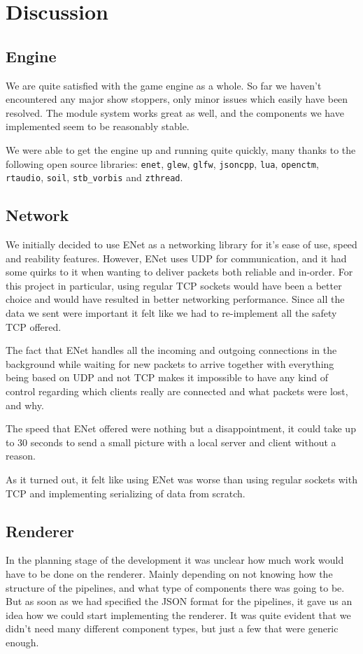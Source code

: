 \chapter{Discussion}

\section{Engine}
We are quite satisfied with the game engine as a whole. So far we haven't encountered any major show stoppers, only minor issues which easily have been resolved. The module system works great as well, and the components we have implemented seem to be reasonably stable.

We were able to get the engine up and running quite quickly, many thanks to the following open source libraries: \texttt{enet}, \texttt{glew}, \texttt{glfw}, \texttt{jsoncpp}, \texttt{lua}, \texttt{openctm}, \texttt{rtaudio}, \texttt{soil}, \texttt{stb\_vorbis} and \texttt{zthread}.

\section{Network}
We initially decided to use ENet as a networking library for it's ease of use, speed and reability features. However, ENet uses UDP for communication, and it had some quirks to it when wanting to deliver packets both reliable and in-order. For this project in particular, using regular TCP sockets would have been a better choice and would have resulted in better networking \mbox{performance}. 
Since all the data we sent were important it felt like we had to re-implement all the safety TCP offered.

The fact that ENet handles all the incoming and outgoing connections in the background while waiting for new packets to arrive together with everything being based on UDP and not TCP makes it impossible to have any kind of control regarding which clients really are connected and what packets were lost, and why.

The speed that ENet offered were nothing but a disappointment, it could take up to 30 seconds to send a small picture with a local server and client without a reason.

As it turned out, it felt like using ENet was worse than using regular sockets with TCP and implementing serializing of data from scratch.


\section{Renderer}
In the planning stage of the development it was unclear how much work would have to be done on the renderer. Mainly depending on not knowing how the structure of the pipelines, and what type of components there was going to be. But as soon as we had specified the JSON format for the pipelines, it gave us an idea how we could start implementing the renderer. It was quite evident that we didn't need many different component types, but just a few that were generic enough.

